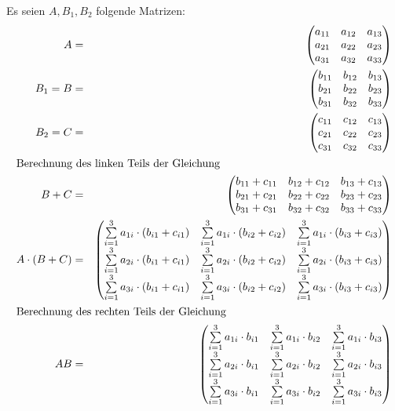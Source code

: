 \documentclass[10pt,a4paper,oneside,ngerman,numbers=noenddot]{scrartcl}
\begin{document}
Es seien $A,B_{1},B_{2}$ folgende Matrizen:
\begin{alignat*}{2}
A &=& \begin{pmatrix} a_{11} & a_{12} & a_{13} \\ a_{21} & a_{22} & a_{23} \\ a_{31} & a_{32} & a_{33} \end{pmatrix} \\
B_{1} = B &=& \begin{pmatrix} b_{11} & b_{12} & b_{13} \\ b_{21} & b_{22} & b_{23} \\ b_{31} & b_{32} & b_{33} \end{pmatrix} \\
B_{2} = C &=& \begin{pmatrix} c_{11} & c_{12} & c_{13} \\ c_{21} & c_{22} & c_{23} \\ c_{31} & c_{32} & c_{33} \end{pmatrix} \\
\intertext{Berechnung des linken Teils der Gleichung}
B + C &=& \begin{pmatrix} b_{11} + c_{11} & b_{12} + c_{12} & b_{13} + c_{13} \\ b_{21} + c_{21} & b_{22} + c_{22} & b_{23} + c_{23} \\ b_{31} + c_{31} & b_{32} + c_{32} & b_{33} + c_{33} \end{pmatrix} \\
A \cdot (B+C) &=& \begin{pmatrix} \sum\limits_{i=1}^{3} a_{1i} \cdot (b_{i1} + c_{i1}) & \sum\limits_{i=1}^{3} a_{1i} \cdot (b_{i2} + c_{i2}) & \sum\limits_{i=1}^{3} a_{1i} \cdot (b_{i3} + c_{i3})  \\ \sum\limits_{i=1}^{3} a_{2i} \cdot (b_{i1} + c_{i1}) & \sum\limits_{i=1}^{3} a_{2i} \cdot (b_{i2} + c_{i2}) & \sum\limits_{i=1}^{3} a_{2i} \cdot (b_{i3} + c_{i3}) \\ \sum\limits_{i=1}^{3} a_{3i} \cdot (b_{i1} + c_{i1}) & \sum\limits_{i=1}^{3} a_{3i} \cdot (b_{i2} + c_{i2}) & \sum\limits_{i=1}^{3} a_{3i} \cdot (b_{i3} + c_{i3}) \end{pmatrix} \\
\intertext{Berechnung des rechten Teils der Gleichung}
AB &=& \begin{pmatrix} \sum\limits_{i=1}^{3} a_{1i} \cdot b_{i1} & \sum\limits_{i=1}^{3} a_{1i} \cdot b_{i2} & \sum\limits_{i=1}^{3} a_{1i} \cdot b_{i3} \\ \sum\limits_{i=1}^{3} a_{2i} \cdot b_{i1} & \sum\limits_{i=1}^{3} a_{2i} \cdot b_{i2} & \sum\limits_{i=1}^{3} a_{2i} \cdot b_{i3} \\ \sum\limits_{i=1}^{3} a_{3i} \cdot b_{i1} & \sum\limits_{i=1}^{3} a_{3i} \cdot b_{i2} & \sum\limits_{i=1}^{3} a_{3i} \cdot b_{i3} \end{pmatrix} \\

\end{alignat*}
\end{document}
